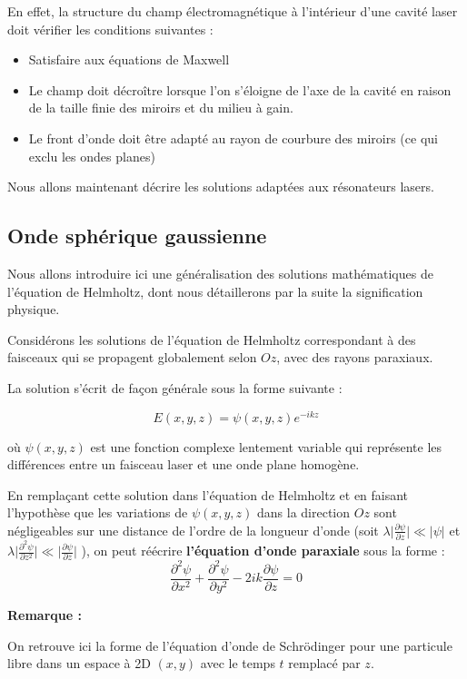 \documentclass{book}
\begin{document}
En effet, la structure du champ électromagnétique à l'intérieur d'une cavité laser doit vérifier les conditions suivantes :
\begin{itemize}
    \item Satisfaire aux équations de Maxwell
    \item Le champ doit décroître lorsque l'on s'éloigne de l'axe de la cavité en raison de la taille finie des miroirs et du milieu à gain.
    \item Le front d'onde doit être adapté au rayon de courbure des miroirs (ce qui exclu les ondes planes)
\end{itemize}
Nous allons maintenant décrire les solutions adaptées aux résonateurs lasers. 

\subsection{Onde sphérique gaussienne}

 Nous allons introduire ici une généralisation des solutions mathématiques de l'équation de Helmholtz, dont nous détaillerons par la suite la signification physique.

Considérons les solutions de l'équation de Helmholtz correspondant à des faisceaux qui se propagent globalement selon $Oz$, avec des rayons paraxiaux.

La solution s'écrit de façon générale sous la forme suivante :

$$E(x, y, z) = \psi (x, y, z) e^{-ikz}$$

où $\psi (x, y, z)$ est une fonction complexe lentement variable qui représente les différences entre un faisceau laser et une onde plane homogène.

En remplaçant cette solution dans l'équation de Helmholtz et en faisant l'hypothèse que les variations de $\psi
            (x, y, z)$ dans la direction $Oz$ sont négligeables sur une distance de l'ordre de la longueur d'onde (soit $\lambda
            \lvert
            \frac {\partial \psi}{\partial z}\rvert \ll \lvert \psi \rvert$ et $\lambda \lvert \frac {\partial ^2
            \psi}{\partial z^2}\rvert \ll \lvert \frac {\partial \psi}{\partial z}\rvert$ ), on peut réécrire \textbf{\color{red}l'équation d'onde paraxiale} sous la forme :
            $$\frac {\partial ^2
            \psi}{\partial
            x^2}+\frac {\partial ^2 \psi}{\partial y^2} -2ik \frac {\partial \psi}{\partial z}=0$$
            
\textbf{\color{remarque1}Remarque :}  
\begin{mdframed}[linecolor=remarque1, backgroundcolor=remarque2]
On retrouve ici la forme de l'équation d'onde de Schrödinger pour une particule libre dans un espace à 2D $(x,y)$ avec le temps $t$ remplacé par $z$. 
\end{mdframed}
\end{document}

